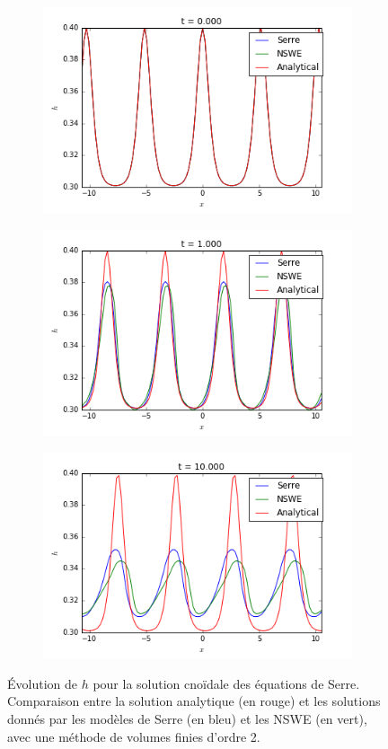 \begin{figure}[h!]
	\begin{subfigure}{.3\linewidth}
		\includegraphics[scale=.3]{figures/Serre/cnoidal1h.png}	
	\end{subfigure}
	\begin{subfigure}{.3\linewidth}
		\includegraphics[scale=.3]{figures/Serre/cnoidal2h.png}	
	\end{subfigure}
	\begin{subfigure}{.3\linewidth}
		\includegraphics[scale=.3]{figures/Serre/cnoidal3h.png}	
	\end{subfigure}
	\caption{Évolution de $h$ pour la solution cnoïdale des équations de Serre. Comparaison entre la solution analytique (en rouge) et les solutions donnés par les modèles de Serre (en bleu) et les NSWE (en vert), avec une méthode de volumes finies d'ordre 2. \label{fig:cnoidalhOrdre2}}
\end{figure}